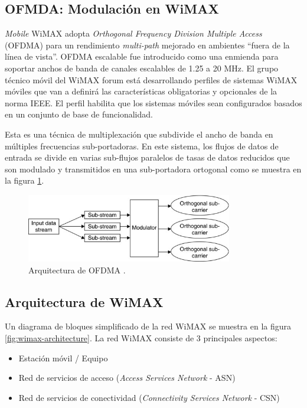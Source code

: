 \documentclass[10pt,journal,compsoc]{IEEEtran}
\begin{document}
\subsection{OFMDA: Modulación en WiMAX}
\emph{Mobile} WiMAX adopta \emph{Orthogonal Frequency Division Multiple Access} (OFDMA) para un rendimiento \emph{multi-path} mejorado en ambientes ``fuera de la línea de vista''. OFDMA escalable fue introducido como una enmienda para soportar anchos de banda de canales escalables de 1.25 a 20 MHz. El grupo técnico móvil del WiMAX forum está desarrollando perfiles de sistemas WiMAX móviles que van a definirá las características obligatorias y opcionales de la norma IEEE. El perfil habilita que los sistemas móviles sean configurados basados en un conjunto de base de funcionalidad. 

Esta es una técnica de multiplexación que subdivide el ancho de banda en múltiples frecuencias sub-portadoras. En este sistema, los flujos de datos de entrada se divide en varias sub-flujos paralelos de tasas de datos reducidos que son modulado y transmitidos en una sub-portadora ortogonal como se muestra en la figura \ref{fig:ofdma}.

\begin{figure}[h]
    \centering
    \includegraphics[width=9cm]{ofdma}
    \caption{Arquitectura de OFDMA \cite{davis}.}
    \label{fig:ofdma}
\end{figure}

\subsection{Arquitectura de WiMAX}
Un diagrama de bloques simplificado de la red WiMAX se muestra en la figura \ref{fig:wimax-architecture}. La red WiMAX consiste de 3 principales aspectos:
\begin{itemize}
    \item Estación móvil / Equipo
    \item Red de servicios de acceso (\emph{Access Services Network} - ASN)
    \item Red de servicios de conectividad (\emph{Connectivity Services Network} - CSN)
\end{itemize}
\end{document}
